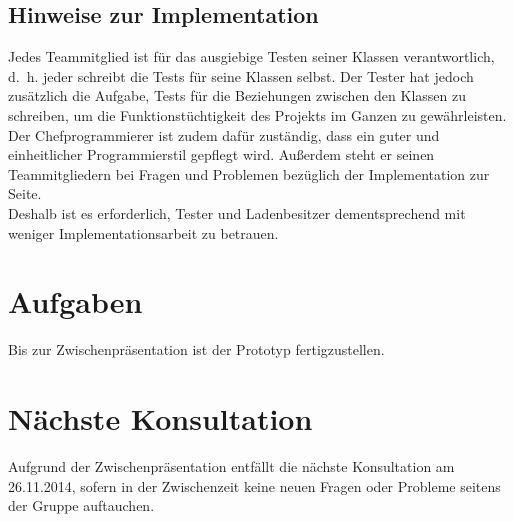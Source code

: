 \documentclass{scrartcl}
\begin{document}
\subsection{Hinweise zur Implementation}
Jedes Teammitglied ist für das ausgiebige Testen seiner Klassen verantwortlich, d.~h. jeder schreibt die Tests für seine Klassen selbst. Der Tester hat jedoch zusätzlich die Aufgabe, Tests für die Beziehungen zwischen den Klassen zu schreiben, um die Funktionstüchtigkeit des Projekts im Ganzen zu gewährleisten. \\
Der Chefprogrammierer ist zudem dafür zuständig, dass ein guter und einheitlicher Programmierstil gepflegt wird. Außerdem steht er seinen Teammitgliedern bei Fragen und Problemen bezüglich der Implementation zur Seite. \\
Deshalb ist es erforderlich, Tester und Ladenbesitzer dementsprechend mit weniger Implementationsarbeit zu betrauen.
\vspace*{1em}

\section{Aufgaben}
Bis zur Zwischenpr\"asentation ist der Prototyp fertigzustellen.

\section{N\"achste Konsultation}
Aufgrund der Zwischenpräsentation entfällt die nächste Konsultation am 26.11.2014, sofern in der Zwischenzeit keine neuen Fragen oder Probleme seitens der Gruppe auftauchen.
\end{document}
